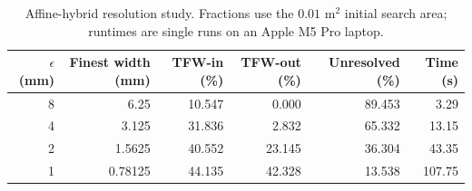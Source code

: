 \begin{table}[t]
\centering\small
\caption{Affine-hybrid resolution study. Fractions use the $0.01$ m$^2$ initial search area; runtimes are single runs on an Apple M5 Pro laptop.}
\label{tab: resolution study}
\begin{tabular}{rrrrrr}
\toprule
$\epsilon$ (mm) & Finest width (mm) & TFW-in (\%) & TFW-out (\%) & Unresolved (\%) & Time (s) \\
\midrule
8 & 6.25 & 10.547 & 0.000 & 89.453 & 3.29 \\
4 & 3.125 & 31.836 & 2.832 & 65.332 & 13.15 \\
2 & 1.5625 & 40.552 & 23.145 & 36.304 & 43.35 \\
1 & 0.78125 & 44.135 & 42.328 & 13.538 & 107.75 \\
\bottomrule
\end{tabular}
\end{table}
